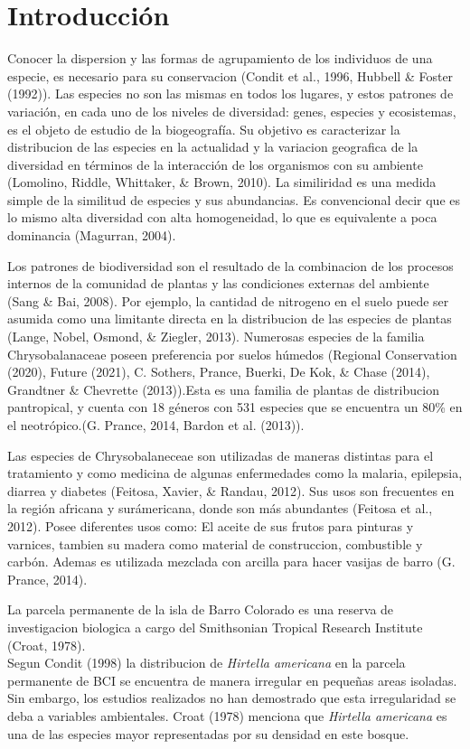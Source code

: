 \documentclass[11pt,]{article}
\begin{document}
\vskip 6.5pt


\noindent  \section{Introducción}\label{introducciuxf3n}

Conocer la dispersion y las formas de agrupamiento de los individuos de
una especie, es necesario para su conservacion (Condit et al., 1996,
Hubbell \& Foster (1992)). Las especies no son las mismas en todos los
lugares, y estos patrones de variación, en cada uno de los niveles de
diversidad: genes, especies y ecosistemas, es el objeto de estudio de la
biogeografía. Su objetivo es caracterizar la distribucion de las
especies en la actualidad y la variacion geografica de la diversidad en
términos de la interacción de los organismos con su ambiente (Lomolino,
Riddle, Whittaker, \& Brown, 2010). La similiridad es una medida simple
de la similitud de especies y sus abundancias. Es convencional decir que
es lo mismo alta diversidad con alta homogeneidad, lo que es equivalente
a poca dominancia (Magurran, 2004).

Los patrones de biodiversidad son el resultado de la combinacion de los
procesos internos de la comunidad de plantas y las condiciones externas
del ambiente (Sang \& Bai, 2008). Por ejemplo, la cantidad de nitrogeno
en el suelo puede ser asumida como una limitante directa en la
distribucion de las especies de plantas (Lange, Nobel, Osmond, \&
Ziegler, 2013). Numerosas especies de la familia Chrysobalanaceae poseen
preferencia por suelos húmedos (Regional Conservation (2020), Future
(2021), C. Sothers, Prance, Buerki, De Kok, \& Chase (2014), Grandtner
\& Chevrette (2013)).Esta es una familia de plantas de distribucion
pantropical, y cuenta con 18 géneros con 531 especies que se encuentra
un 80\% en el neotrópico.(G. Prance, 2014, Bardon et al. (2013)).

Las especies de Chrysobalaneceae son utilizadas de maneras distintas
para el tratamiento y como medicina de algunas enfermedades como la
malaria, epilepsia, diarrea y diabetes (Feitosa, Xavier, \& Randau,
2012). Sus usos son frecuentes en la región africana y surámericana,
donde son más abundantes (Feitosa et al., 2012). Posee diferentes usos
como: El aceite de sus frutos para pinturas y varnices, tambien su
madera como material de construccion, combustible y carbón. Ademas es
utilizada mezclada con arcilla para hacer vasijas de barro (G. Prance,
2014).

La parcela permanente de la isla de Barro Colorado es una reserva de
investigacion biologica a cargo del Smithsonian Tropical Research
Institute (Croat, 1978).\\
Segun Condit (1998) la distribucion de \emph{Hirtella americana} en la
parcela permanente de BCI se encuentra de manera irregular en pequeñas
areas isoladas. Sin embargo, los estudios realizados no han demostrado
que esta irregularidad se deba a variables ambientales. Croat (1978)
menciona que \emph{Hirtella americana} es una de las especies mayor
representadas por su densidad en este bosque.
\end{document}
